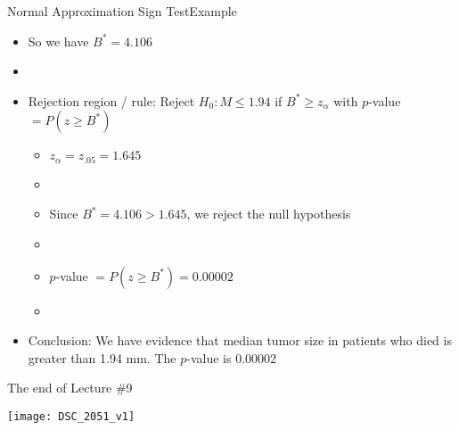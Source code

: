 \documentclass[xcolor=dvipsnames]{beamer}
\begin{document}
\begin{frame}{Normal Approximation Sign Test}{Example}
\begin{itemize}
	\item So we have $B^* = 4.106$ \pause
	\item[]
	\item Rejection region / rule: Reject $H_0: M \leq 1.94$ if $B^* \geq z_{\alpha}$ with $p$-value $=P(z \geq B^*)$ \pause
	\begin{itemize}
		\item $z_{\alpha} = z_{.05} = 1.645$ \pause
		\item[]
		\item Since $B^* = 4.106 > 1.645$, we reject the null hypothesis \pause
		\item[]
		\item $p$-value $=P(z \geq B^*) =  0.00002$ \pause
		\item[]
	\end{itemize}
	\item Conclusion: We have evidence that median tumor size in patients who died is greater than 1.94 mm. The $p$-value is 0.00002
\end{itemize}
\end{frame}

\begin{frame}{The end of Lecture \#9}
	\begin{center}
		\texttt{[image: DSC\_2051\_v1]}
	\end{center}
\end{frame}
\end{document}

